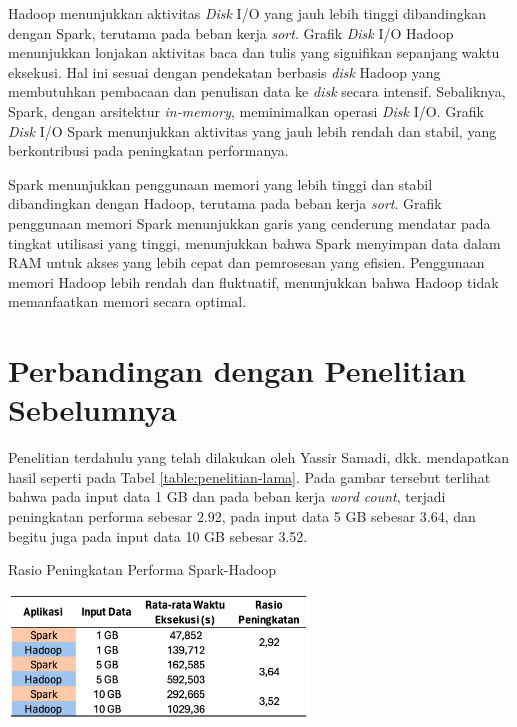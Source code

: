 Hadoop menunjukkan aktivitas \textit{Disk} I/O yang jauh lebih tinggi dibandingkan dengan Spark, terutama pada beban kerja \textit{sort}. Grafik \textit{Disk} I/O Hadoop menunjukkan lonjakan aktivitas baca dan tulis yang signifikan sepanjang waktu eksekusi. Hal ini sesuai dengan pendekatan berbasis \textit{disk} Hadoop yang membutuhkan pembacaan dan penulisan data ke \textit{disk} secara intensif. Sebaliknya, Spark, dengan arsitektur \textit{in-memory}, meminimalkan operasi \textit{Disk} I/O. Grafik \textit{Disk} I/O Spark menunjukkan aktivitas yang jauh lebih rendah dan stabil, yang berkontribusi pada peningkatan performanya.

Spark menunjukkan penggunaan memori yang lebih tinggi dan stabil dibandingkan dengan Hadoop, terutama pada beban kerja \textit{sort}. Grafik penggunaan memori Spark menunjukkan garis yang cenderung mendatar pada tingkat utilisasi yang tinggi, menunjukkan bahwa Spark menyimpan data dalam RAM untuk akses yang lebih cepat dan pemrosesan yang efisien. Penggunaan memori Hadoop lebih rendah dan fluktuatif, menunjukkan bahwa Hadoop tidak memanfaatkan memori secara optimal. 

\section{Perbandingan dengan Penelitian Sebelumnya \cite{samadiPerformanceComparisonHadoop2018}}
Penelitian terdahulu yang telah dilakukan oleh Yassir Samadi, dkk. mendapatkan hasil seperti pada Tabel \ref{table:penelitian-lama}. Pada gambar tersebut terlihat bahwa pada input data 1 GB dan pada beban kerja \textit{word count}, terjadi peningkatan performa sebesar 2.92, pada input data 5 GB sebesar 3.64, dan begitu juga pada input data 10 GB sebesar 3.52.


\begin{table}[h]
  \centering
  \caption{Rasio Peningkatan Performa Spark-Hadoop \cite{samadiPerformanceComparisonHadoop2018}}
  \includegraphics[width=0.6\textwidth]{figures/ch04/0-penelitian-lama-new}
  \label{table:penelitian-lama}
\end{table}

